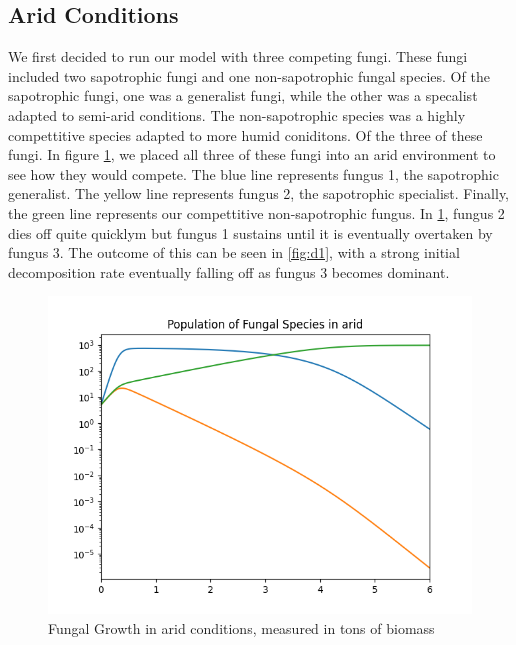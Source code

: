 \documentclass[twocolumn]{article} %
\begin{document}
\subsection{Arid Conditions}
\noindent We first decided to run our model with three competing fungi. These fungi included two sapotrophic fungi and one non-sapotrophic fungal species. Of the sapotrophic fungi, one was a generalist fungi, while the other was a specalist adapted to semi-arid conditions. The non-sapotrophic species was a highly compettitive species adapted to more humid coniditons. Of the three of these fungi. In figure \ref{fig:f1}, we placed all three of these fungi into an arid environment to see how they would compete. The blue line represents fungus 1, the sapotrophic generalist. The yellow line represents fungus 2, the sapotrophic specialist. Finally, the green line represents our compettitive non-sapotrophic fungus. In \ref{fig:f1}, fungus 2 dies off quite quicklym but fungus 1 sustains until it is eventually overtaken by fungus 3. The outcome of this can be seen in \ref{fig:d1}, with a strong initial decomposition rate eventually falling off as fungus 3 becomes dominant.
\begin{figure}[bt]
	\includegraphics[width=\columnwidth]{figures/Figure_1.png}
      \caption{Fungal Growth in arid conditions, measured in tons of biomass}
      \label{fig:f1}
\end{figure}
\end{document}
